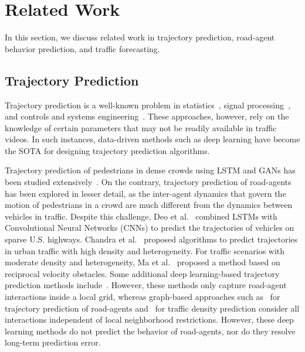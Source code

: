 \documentclass[10pt,twocolumn,letterpaper]{article}
\theoremstyle{plain}
\begin{document}
 \section{Related Work}

In this section, we discuss related work in trajectory prediction, road-agent behavior prediction, and traffic forecasting.

\subsection{Trajectory Prediction}

Trajectory prediction is a well-known problem in statistics~\cite{box2015time}, signal processing~\cite{early4-kalman,particle}, and controls and systems engineering~\cite{ljung2001system}. These approaches, however, rely on the knowledge of certain parameters that may not be readily available in traffic videos. In such instances, data-driven methods such as deep learning have become the SOTA for designing trajectory prediction algorithms.




Trajectory prediction of pedestrians in dense crowds using LSTM and GANs has been studied extensively~\cite{pedestrian_cvpr17,pedestrian_cvpr18,pedestrian2_cvpr18,pedestrian_wacv18,pedestrian2_wacv18,pedestrian_cvpr19,pedestrian2_cvpr19,pedestrian3_cvpr19,pedestrian_eccv18}.
On the contrary, trajectory prediction of road-agents has been explored in lesser detail, as the inter-agent dynamics that govern the motion of pedestrians in a crowd are much different from the dynamics between vehicles in traffic. Despite this challenge, Deo et al.~\cite{nachiket} combined LSTMs with Convolutional Neural Networks (CNNs) to predict the trajectories of vehicles on sparse U.S. highways. Chandra et al.~\cite{traphic, chandra2019robusttp} proposed algorithms to predict trajectories in urban traffic with high density and heterogeneity. For traffic scenarios with moderate density and heterogeneity, Ma et al.~\cite{ma2018trafficpredict} proposed a method based on reciprocal velocity obstacles. Some additional deep learning-based trajectory prediction methods include~\cite{cnnpredict1,cnnpredict2}. However, these methods only capture road-agent interactions inside a local grid, whereas graph-based approaches such as~\cite{guo2019attention,Yu2018SpatioTemporalGC} for trajectory prediction of road-agents and~\cite{cui2018traffic,guo2019attention,Yu2018SpatioTemporalGC,diao2019dynamic} for traffic density prediction consider all interactions independent of local neighborhood restrictions. However, these deep learning methods do not predict the behavior of road-agents, nor do they resolve long-term prediction error.
\end{document}
